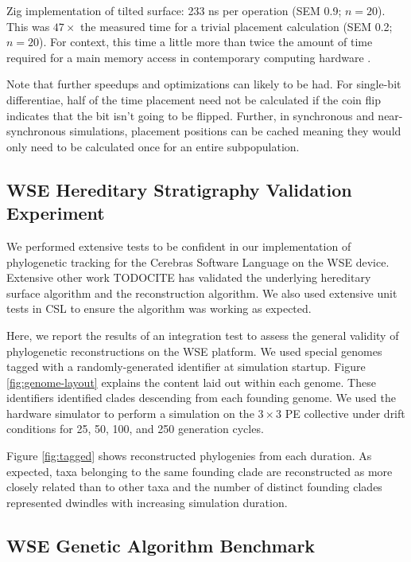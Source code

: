Zig implementation of tilted surface:
233 ns per operation (SEM 0.9; $n=20$).
This was $47\times$ the measured time for a trivial placement calculation (SEM 0.2; $n=20$).
For context, this time a little more than twice the amount of time required for a main memory access in contemporary computing hardware \citep{markus2022memory}.

Note that further speedups and optimizations can likely to be had.
For single-bit differentiae, half of the time placement need not be calculated if the coin flip indicates that the bit isn't going to be flipped.
Further, in synchronous and near-synchronous simulations, placement positions can be cached meaning they would only need to be calculated once for an entire subpopulation.

\subsection{WSE Hereditary Stratigraphy Validation Experiment}

We performed extensive tests to be confident in our implementation of phylogenetic tracking for the Cerebras Software Language on the WSE device.
Extensive other work TODOCITE has validated the underlying hereditary surface algorithm and the reconstruction algorithm.
We also used extensive unit tests in CSL to ensure the algorithm was working as expected.

Here, we report the results of an integration test to assess the general validity of phylogenetic reconstructions on the WSE platform.
We used special genomes tagged with a randomly-generated identifier at simulation startup.
Figure \ref{fig:genome-layout} explains the content laid out within each genome.
These identifiers identified clades descending from each founding genome.
We used the hardware simulator to perform a simulation on the $3\times3$ PE collective under drift conditions for 25, 50, 100, and 250 generation cycles.



Figure \ref{fig:tagged} shows reconstructed phylogenies from each duration.
As expected, taxa belonging to the same founding clade are reconstructed as more closely related than to other taxa and the number of distinct founding clades represented dwindles with increasing simulation duration.

\subsection{WSE Genetic Algorithm Benchmark}

